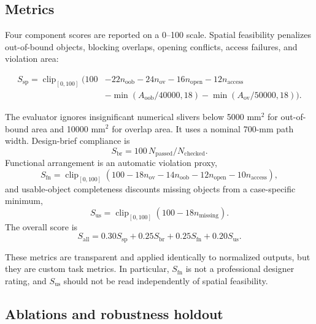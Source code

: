 \documentclass[pdflatex,sn-mathphys-num]{sn-jnl}
\newcommand{\scoreOverall}{S_{\mathrm{all}}}
\newcommand{\scoreSpatial}{S_{\mathrm{sp}}}
\newcommand{\scoreBrief}{S_{\mathrm{br}}}
\newcommand{\scoreFunction}{S_{\mathrm{fn}}}
\newcommand{\scoreUsable}{S_{\mathrm{us}}}
\begin{document}
\subsection{Metrics}

Four component scores are reported on a 0--100 scale. Spatial feasibility penalizes out-of-bound objects, blocking overlaps, opening conflicts, access failures, and violation area:

\begin{align}
  \scoreSpatial = \operatorname{clip}_{[0,100]}\bigg(
    100
    &-22n_{\mathrm{oob}}
    -24n_{\mathrm{ov}}
    -16n_{\mathrm{open}}
    -12n_{\mathrm{access}} \nonumber\\
    &-\min(A_{\mathrm{oob}}/40000,18)
    -\min(A_{\mathrm{ov}}/50000,18)
  \bigg).
  \label{eq:spatial-metric}
\end{align}

The evaluator ignores insignificant numerical slivers below 5000 mm\(^2\) for out-of-bound area and 10000 mm\(^2\) for overlap area. It uses a nominal 700-mm path width. Design-brief compliance is
\begin{equation}
  \scoreBrief = 100\,N_{\mathrm{passed}}/N_{\mathrm{checked}}.
\end{equation}
Functional arrangement is an automatic violation proxy,
\begin{equation}
  \scoreFunction=\operatorname{clip}_{[0,100]}
  (100-18n_{\mathrm{ov}}-14n_{\mathrm{oob}}
  -12n_{\mathrm{open}}-10n_{\mathrm{access}}),
\end{equation}
and usable-object completeness discounts missing objects from a case-specific minimum,
\begin{equation}
  \scoreUsable=\operatorname{clip}_{[0,100]}(100-18n_{\mathrm{missing}}).
\end{equation}
The overall score is
\begin{equation}
  \scoreOverall =
  0.30\scoreSpatial+0.25\scoreBrief+
  0.25\scoreFunction+0.20\scoreUsable.
  \label{eq:overall-metric}
\end{equation}

These metrics are transparent and applied identically to normalized outputs, but they are custom task metrics. In particular, \(\scoreFunction\) is not a professional designer rating, and \(\scoreUsable\) should not be read independently of spatial feasibility.

\subsection{Ablations and robustness holdout}
\end{document}
